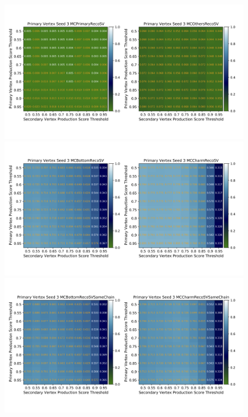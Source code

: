 \begin{figure}[htbp]
 \centering
  \begin{minipage}{1.0\textwidth}
   \centering
    \includegraphics[trim = 0 140 0 140, width=0.95\textwidth, clip]{Figure/4VertexFinderwithDL/4-2-2-4TrackEfficiencyPVOthers.png}
   \end{minipage}
   
   \begin{minipage}{1.0\textwidth}
   \centering
    \includegraphics[trim = 0 140 0 140, width=0.95\textwidth, clip]{Figure/4VertexFinderwithDL/4-2-2-4TrackEfficiencyBottomCharm.png}
   \end{minipage}
   
   \begin{minipage}{1.0\textwidth}
   \centering
    \includegraphics[trim = 0 140 0 140, width=0.95\textwidth, clip]{Figure/4VertexFinderwithDL/4-2-2-4TrackEfficiencySameChain.png}
   \end{minipage}
   

\end{figure}

